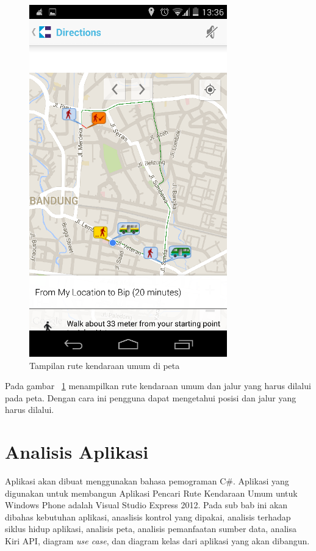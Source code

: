 \begin{figure}[h]
	\centering
		\includegraphics[scale=0.5]{Gambar/KIRI_Android/tampilan_peta}
	\caption{Tampilan rute kendaraan umum di peta}
	\label{fig:peta}
\end{figure}

Pada gambar ~\ref{fig:peta} menampilkan rute kendaraan umum dan jalur yang harus dilalui pada peta. Dengan cara ini pengguna dapat mengetahui posisi dan jalur yang harus dilalui.


\clearpage

\section{Analisis Aplikasi}
\label{lab:Analisis Aplikasi}
\hspace{0.5cm} Aplikasi akan dibuat menggunakan bahasa pemograman C\#. Aplikasi yang digunakan untuk membangun Aplikasi Pencari Rute Kendaraan Umum untuk Windows Phone adalah Visual Studio Express 2012. Pada sub bab ini akan dibahas kebutuhan aplikasi, anaslisis kontrol yang dipakai, analisis terhadap siklus hidup aplikasi, analisis peta, analisis pemanfaatan sumber data, analisa Kiri API, diagram \textit{use case}, dan diagram kelas dari aplikasi yang akan dibangun. 

